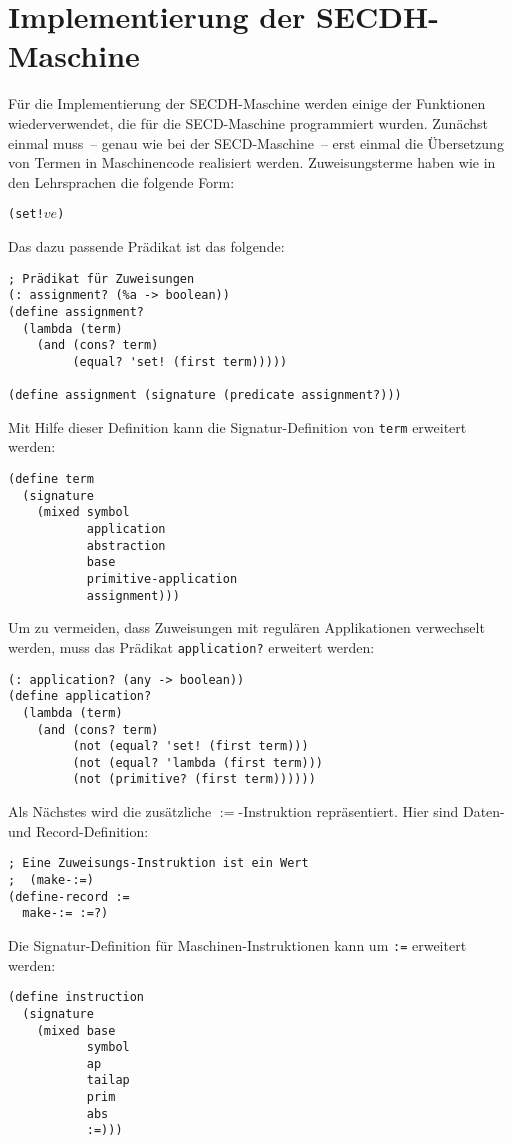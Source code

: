 \section{Implementierung der SECDH-Maschine}


Für die Implementierung der SECDH-Maschine werden einige der
Funktionen wiederverwendet, die für die SECD-Maschine programmiert
wurden.  Zunächst einmal muss~-- genau wie bei der SECD-Maschine~--
erst einmal die Übersetzung von Termen in Maschinencode realisiert
werden.  Zuweisungsterme haben wie in den Lehrsprachen die folgende Form:
%
\begin{alltt}
(set! \(v\) \(e\))
\end{alltt}
%
Das dazu passende Prädikat ist das folgende:
%
\begin{lstlisting}
; Prädikat für Zuweisungen
(: assignment? (%a -> boolean))
(define assignment?
  (lambda (term)
    (and (cons? term)
         (equal? 'set! (first term)))))

(define assignment (signature (predicate assignment?)))
\end{lstlisting}
%
Mit Hilfe dieser Definition kann die Signatur-Definition von
\lstinline{term} erweitert werden:
%
\begin{lstlisting}
(define term
  (signature
    (mixed symbol
           application
           abstraction
           base
           primitive-application
           assignment)))
\end{lstlisting}
%
Um zu vermeiden, dass Zuweisungen mit regulären Applikationen
verwechselt werden, muss das Prädikat \lstinline{application?} erweitert
werden:
%
\begin{lstlisting}
(: application? (any -> boolean))
(define application?
  (lambda (term)
    (and (cons? term)
         (not (equal? 'set! (first term)))
         (not (equal? 'lambda (first term)))
         (not (primitive? (first term))))))
\end{lstlisting}
%
Als Nächstes wird die zusätzliche $\mathtt{:=}$-Instruktion
repräsentiert.  Hier sind Daten- und Record-Definition:
%
\begin{lstlisting}
; Eine Zuweisungs-Instruktion ist ein Wert
;  (make-:=)
(define-record :=
  make-:= :=?)
\end{lstlisting}
%
Die Signatur-Definition für Maschinen-Instruktionen kann um \lstinline{:=}
erweitert werden:
%
\begin{lstlisting}
(define instruction
  (signature
    (mixed base
           symbol
           ap
           tailap
           prim
           abs
           :=)))
\end{lstlisting}

